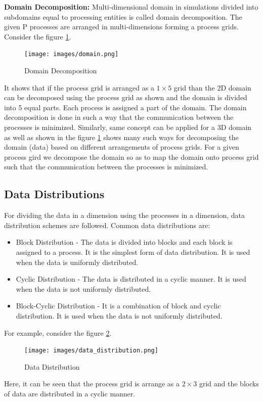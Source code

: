 \documentclass[12pt]{article}
\begin{document}
\textbf{Domain Decomposition: }Multi-dimensional domain in simulations divided into subdomains equal to processing entities is called domain decomposition.
The given P processes are arranged in multi-dimensions forming a process grids. Consider the figure \ref{fig:domain}.
\begin{figure}[H]
    \centering
    \texttt{[image: images/domain.png]}
    \caption{Domain Decomposition}
    \label{fig:domain}
\end{figure}
It shows that if the process grid is arranged as a $1 \times 5$ grid than the 2D domain can be decomposed using the process grid as shown 
and the domain is divided into 5 equal parts. Each process is assigned a part of the domain. The domain decomposition is done in such a way that the communication between the processes is minimized.
Similarly, same concept can be applied for a 3D domain as well as shown in the figure \ref{fig:domain} shows many such ways for decomposing the domain (data) based on different arrangements of process grids.
For a given process gird we decompose the domain so as to map the domain onto process grid such that the communication between the processes is minimized.

\subsection{Data Distributions}
For dividing the data in a dimension using the processes in a dimension, data distribution schemes are followed. 
Common data distributions are:
\begin{itemize}
    \item Block Distribution - The data is divided into blocks and each block is assigned to a process. It is the simplest form of data distribution. It is used when the data is uniformly distributed.
    \item Cyclic Distribution - The data is distributed in a cyclic manner. It is used when the data is not uniformly distributed.
    \item Block-Cyclic Distribution - It is a combination of block and cyclic distribution. It is used when the data is not uniformly distributed.
\end{itemize}
For example, consider the figure \ref{fig:data_distribution}. 
\begin{figure}[H]
    \centering
    \texttt{[image: images/data\_distribution.png]}
    \caption{Data Distribution}
    \label{fig:data_distribution}
\end{figure}
Here, it can be seen that the process grid is arrange as a $2 \times 3$ grid and the blocks of data are distributed in a cyclic manner.
\end{document}
